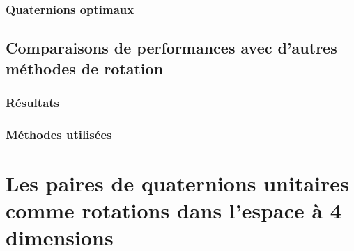 		\subsubsection{Quaternions optimaux}
			
	\subsection{Comparaisons de performances avec d'autres méthodes de rotation}
		\subsubsection{Résultats}
		\subsubsection{Méthodes utilisées}
\section{Les paires de quaternions unitaires comme rotations dans l'espace à 4 dimensions}